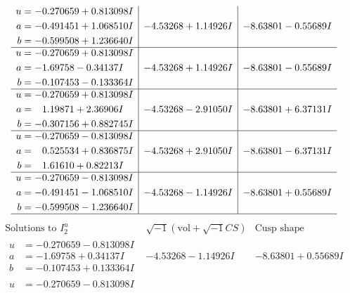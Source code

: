 \documentclass[1p]{elsarticle_modified}
\theoremstyle{definition}
\newcommand{\I}{\sqrt{-1}}
\begin{document}
$$\begin{array}{c|c|c}
\begin{aligned}
u &= -0.270659 + 0.813098 I \\
a &= -0.491451 + 1.068510 I \\
b &= -0.599508 + 1.236640 I\end{aligned}
 & -4.53268 + 1.14926 I & -8.63801 - 0.55689 I \\ \hline\begin{aligned}
u &= -0.270659 + 0.813098 I \\
a &= -1.69758 - 0.34137 I \\
b &= -0.107453 - 0.133364 I\end{aligned}
 & -4.53268 + 1.14926 I & -8.63801 - 0.55689 I \\ \hline\begin{aligned}
u &= -0.270659 + 0.813098 I \\
a &= \phantom{-}1.19871 + 2.36906 I \\
b &= -0.307156 + 0.882745 I\end{aligned}
 & -4.53268 - 2.91050 I & -8.63801 + 6.37131 I \\ \hline\begin{aligned}
u &= -0.270659 - 0.813098 I \\
a &= \phantom{-}0.525534 + 0.836875 I \\
b &= \phantom{-}1.61610 + 0.82213 I\end{aligned}
 & -4.53268 + 2.91050 I & -8.63801 - 6.37131 I \\ \hline\begin{aligned}
u &= -0.270659 - 0.813098 I \\
a &= -0.491451 - 1.068510 I \\
b &= -0.599508 - 1.236640 I\end{aligned}
 & -4.53268 - 1.14926 I & -8.63801 + 0.55689 I\\
 \hline 
 \end{array}$$\newpage$$\begin{array}{c|c|c}  
\text{Solutions to }I^u_{2}& \I (\text{vol} + \sqrt{-1}CS) & \text{Cusp shape}\\
 \hline 
\begin{aligned}
u &= -0.270659 - 0.813098 I \\
a &= -1.69758 + 0.34137 I \\
b &= -0.107453 + 0.133364 I\end{aligned}
 & -4.53268 - 1.14926 I & -8.63801 + 0.55689 I \\ \hline\begin{aligned}
u &= -0.270659 - 0.813098 I \\

\end{aligned}
\end{array}$$
\end{document}
